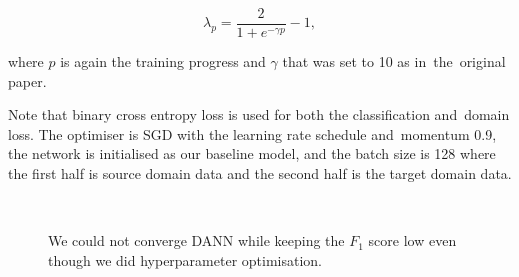 \begin{equation}
	\lambda_p = \frac{2}{1 + e^{-\gamma p}} - 1,
\end{equation}

where \(p\) is again the training progress
and \(\gamma\) that was set to 10 as in~the~original paper.

Note that binary cross entropy loss is used for both the classification and~domain loss.
The optimiser is SGD with the learning rate schedule and~momentum 0.9,
the network is initialised as our baseline model,
and the batch size is 128
where the first half is source domain data and the second half is the target domain data.

\begin{figure}
\begin{center}
\\
\end{center}
\caption[Training of Domain-Adversarial Neural Network]{
	We could not converge DANN while keeping the \(F_1\) score low
	even though we did hyperparameter optimisation.
}
\label{dann_training}
\end{figure}

